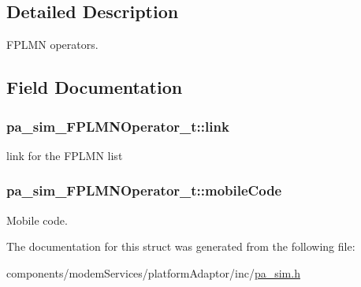 \subsection{Detailed Description}
F\+P\+L\+MN operators. 

\subsection{Field Documentation}
\subsubsection[{\texorpdfstring{link}{link}}]{ pa\+\_\+sim\+\_\+\+F\+P\+L\+M\+N\+Operator\+\_\+t\+::link}\hypertarget{structpa__sim___f_p_l_m_n_operator__t_a990c4bf9c3d5264f64a72fa419b9f9a2}{}\label{structpa__sim___f_p_l_m_n_operator__t_a990c4bf9c3d5264f64a72fa419b9f9a2}


link for the F\+P\+L\+MN list 

\subsubsection[{\texorpdfstring{mobile\+Code}{mobileCode}}]{ pa\+\_\+sim\+\_\+\+F\+P\+L\+M\+N\+Operator\+\_\+t\+::mobile\+Code}\hypertarget{structpa__sim___f_p_l_m_n_operator__t_a65ee9bcff051390020c863e07fcb2481}{}\label{structpa__sim___f_p_l_m_n_operator__t_a65ee9bcff051390020c863e07fcb2481}


Mobile code. 



The documentation for this struct was generated from the following file\+:\begin{DoxyCompactItemize}
\item 
components/modem\+Services/platform\+Adaptor/inc/\hyperlink{pa__sim_8h}{pa\+\_\+sim.\+h}\end{DoxyCompactItemize}
